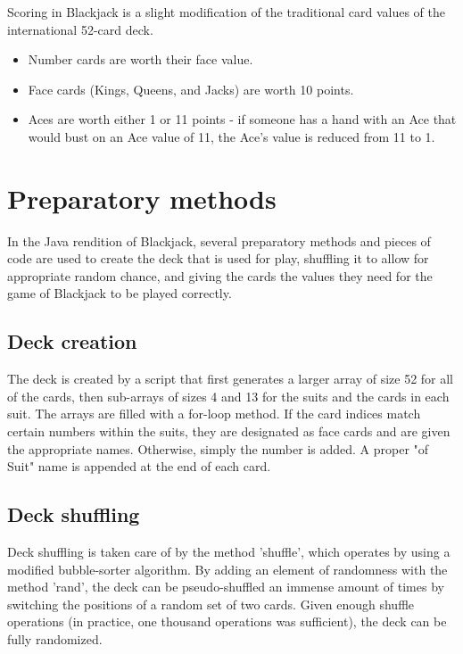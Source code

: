 \documentclass[english]{article}
\begin{document}
Scoring in Blackjack is a slight modification of the traditional card
values of the international 52-card deck.
\begin{itemize}
\item Number cards are worth their face value.
\item Face cards (Kings, Queens, and Jacks) are worth 10 points.
\item Aces are worth either 1 or 11 points - if someone has a hand with
an Ace that would bust on an Ace value of 11, the Ace's value is reduced
from 11 to 1.
\end{itemize}

\section{Preparatory methods}

In the Java rendition of Blackjack, several preparatory methods and pieces of code are
used to create the deck that is used for play, shuffling it to allow
for appropriate random chance, and giving the cards the values they
need for the game of Blackjack to be played correctly. 


\subsection{Deck creation}

The deck is created by a script that first generates a larger array
of size 52 for all of the cards, then sub-arrays of sizes 4 and 13
for the suits and the cards in each suit. The arrays are filled with
a for-loop method. If the card indices match certain numbers within
the suits, they are designated as face cards and are given the appropriate
names. Otherwise, simply the number is added. A proper "of Suit" name is appended at the end of each card.

\subsection{Deck shuffling}

Deck shuffling is taken care of by the method 'shuffle', which operates by using a modified bubble-sorter algorithm. By adding an element of randomness with the method 'rand', the deck can be pseudo-shuffled an immense amount of times by switching the positions of a random set of two cards. Given enough shuffle operations (in practice, one thousand operations was sufficient), the deck can be fully randomized.
\end{document}
